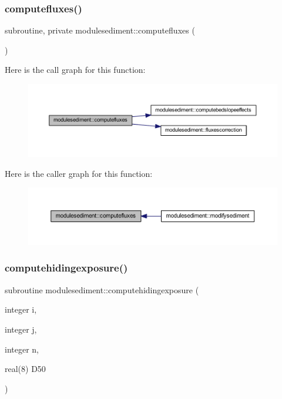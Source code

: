\subsubsection{\texorpdfstring{computefluxes()}{computefluxes()}}
{\footnotesize\ttfamily subroutine, private modulesediment\+::computefluxes (\begin{DoxyParamCaption}{ }\end{DoxyParamCaption})\hspace{0.3cm}{\ttfamily [private]}}

Here is the call graph for this function\+:\nopagebreak
\begin{figure}[H]
\begin{center}
\leavevmode
\includegraphics[width=350pt]{namespacemodulesediment_a1e2e55857d3719dbc4a034eb10281e6c_cgraph}
\end{center}
\end{figure}
Here is the caller graph for this function\+:\nopagebreak
\begin{figure}[H]
\begin{center}
\leavevmode
\includegraphics[width=350pt]{namespacemodulesediment_a1e2e55857d3719dbc4a034eb10281e6c_icgraph}
\end{center}
\end{figure}
\mbox{\label{namespacemodulesediment_a03f094fcbc01dd75c60a5a69ce5dde19}} 
\subsubsection{\texorpdfstring{computehidingexposure()}{computehidingexposure()}}
{\footnotesize\ttfamily subroutine modulesediment\+::computehidingexposure (\begin{DoxyParamCaption}\item[{integer}]{i,  }\item[{integer}]{j,  }\item[{integer}]{n,  }\item[{real(8)}]{D50 }\end{DoxyParamCaption})\hspace{0.3cm}{\ttfamily [private]}}

